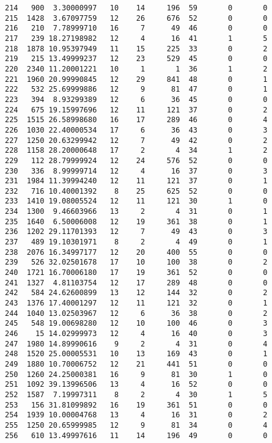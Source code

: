 \documentclass[
  letterpaper,
  DIV=11,
  numbers=noendperiod]{scrreprt}
\begin{document}
\begin{verbatim}
214   900  3.30000997   10    14     196  59       0       0
215  1428  3.67097759   12    26     676  52       0       0
216   210  7.78999710   16     7      49  46       0       0
217   239 18.27198982   12     4      16  41       1       5
218  1878 10.95397949   11    15     225  33       0       2
219   215 13.49999237   12    23     529  45       0       0
220  2340 11.20001221   10     1       1  36       1       2
221  1960 20.99990845   12    29     841  48       0       1
222   532 25.69999886   12     9      81  47       0       1
223   394  8.93299389   12     6      36  45       0       0
224   675 19.15997696   12    11     121  37       0       2
225  1515 26.58998680   16    17     289  46       0       4
226  1030 22.40000534   17     6      36  43       0       3
227  1250 20.63299942   12     7      49  42       0       2
228  1158 28.20000648   17     2       4  34       1       2
229   112 28.79999924   12    24     576  52       0       0
230   336  8.99999714   12     4      16  37       0       3
231  1984 11.39994240   12    11     121  37       0       1
232   716 10.40001392    8    25     625  52       0       0
233  1410 19.08005524   12    11     121  30       1       0
234  1300  9.46603966   13     2       4  31       0       1
235  1640  6.50006008   12    19     361  38       0       1
236  1202 29.11701393   12     7      49  43       0       3
237   489 19.10301971    8     2       4  49       0       1
238  2076 16.34997177   12    20     400  55       0       0
239   526 32.02501678   17    10     100  38       0       2
240  1721 16.70006180   17    19     361  52       0       0
241  1327  4.81103754   12    17     289  48       0       0
242   584 24.62600899   13    12     144  32       0       2
243  1376 17.40001297   12    11     121  32       0       1
244  1040 13.02503967   12     6      36  38       0       2
245   548 19.00698280   12    10     100  46       0       3
246    15 14.02999973   12     4      16  40       0       3
247  1980 14.89990616    9     2       4  31       0       4
248  1520 25.00005531   10    13     169  43       0       1
249  1880 10.70006752   12    21     441  51       0       0
250  1260 24.25000381   16     9      81  30       1       0
251  1092 39.13996506   13     4      16  52       0       0
252  1587  7.19997311    8     2       4  30       1       5
253   156 31.81099892   16    19     361  51       0       0
254  1939 10.00004768   13     4      16  31       0       2
255  1250 20.65999985   12     9      81  34       0       4
256   610 13.49997616   11    14     196  49       0       0

\end{verbatim}
\end{document}

